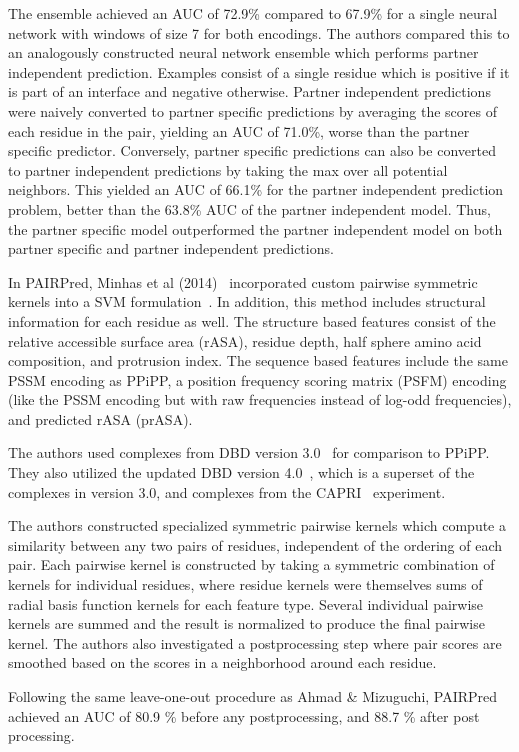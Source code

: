 The ensemble achieved an AUC of 72.9\% compared to 67.9\% for a single neural network with windows of size 7 for both encodings.
The authors compared this to an analogously constructed neural network ensemble which performs partner independent prediction.
Examples consist of a single residue which is positive if it is part of an interface and negative otherwise.
Partner independent predictions were naively converted to partner specific predictions by averaging the scores of each residue in the pair, yielding an AUC of 71.0\%, worse than the partner specific predictor.
Conversely, partner specific predictions can also be converted to partner independent predictions by taking the max over all potential neighbors. 
This yielded an AUC of 66.1\% for the partner independent prediction problem, better than the 63.8\% AUC of the partner independent model.
Thus, the partner specific model outperformed the partner independent model on both partner specific and partner independent predictions.

In PAIRPred, Minhas et al (2014)~\cite{minhas2014} incorporated custom pairwise symmetric kernels into a SVM formulation~\cite{minhas2014}.
In addition, this method includes structural information for each residue as well.
The structure based features consist of the relative accessible surface area (rASA), residue depth, half sphere amino acid composition, and protrusion index.
The sequence based features include the same PSSM encoding as PPiPP, a position frequency scoring matrix (PSFM) encoding (like the PSSM encoding but with raw frequencies instead of log-odd frequencies), and predicted rASA (prASA).

The authors used complexes from DBD version 3.0~\cite{hwang2008} for comparison to PPiPP.
They also utilized the updated DBD version 4.0~\cite{hwang2010}, which is a superset of the complexes in version 3.0, and complexes from the CAPRI~\cite{janin2013} experiment.

The authors constructed specialized symmetric pairwise kernels which compute a similarity between any two pairs of residues, independent of the ordering of each pair.
Each pairwise kernel is constructed by taking a symmetric combination of kernels for individual residues, where residue kernels were themselves sums of radial basis function kernels for each feature type.
Several individual pairwise kernels are summed and the result is normalized to produce the final pairwise kernel.
The authors also investigated a postprocessing step where pair scores are smoothed based on the scores in a neighborhood around each residue.

Following the same leave-one-out procedure as Ahmad \& Mizuguchi, PAIRPred achieved an AUC of 80.9 \% before any postprocessing, and 88.7 \% after post processing.